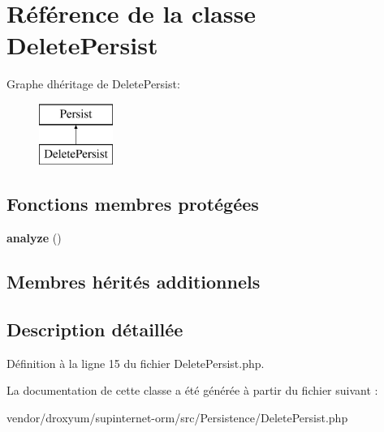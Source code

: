 \hypertarget{class_o_r_m_1_1_persistence_1_1_delete_persist}{}\section{Référence de la classe Delete\+Persist}
\label{class_o_r_m_1_1_persistence_1_1_delete_persist}
Graphe d\textquotesingle{}héritage de Delete\+Persist\+:\begin{figure}[H]
\begin{center}
\leavevmode
\includegraphics[height=2.000000cm]{class_o_r_m_1_1_persistence_1_1_delete_persist}
\end{center}
\end{figure}
\subsection*{Fonctions membres protégées}
\begin{DoxyCompactItemize}
\item 
{\bfseries analyze} ()\hypertarget{class_o_r_m_1_1_persistence_1_1_delete_persist_a9290b43f1b62e53c93e5a72c2cc8413f}{}\label{class_o_r_m_1_1_persistence_1_1_delete_persist_a9290b43f1b62e53c93e5a72c2cc8413f}

\end{DoxyCompactItemize}
\subsection*{Membres hérités additionnels}


\subsection{Description détaillée}


Définition à la ligne 15 du fichier Delete\+Persist.\+php.



La documentation de cette classe a été générée à partir du fichier suivant \+:\begin{DoxyCompactItemize}
\item 
vendor/droxyum/supinternet-\/orm/src/\+Persistence/Delete\+Persist.\+php\end{DoxyCompactItemize}
